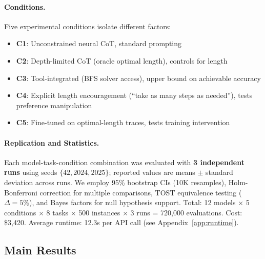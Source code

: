\documentclass{article}
\theoremstyle{plain}
\theoremstyle{definition}
\theoremstyle{remark}
\begin{document}
\paragraph{Conditions.} Five experimental conditions isolate different factors:
\begin{itemize}[leftmargin=*,itemsep=0pt]
\item \textbf{C1}: Unconstrained neural CoT, standard prompting
\item \textbf{C2}: Depth-limited CoT (oracle optimal length), controls for length
\item \textbf{C3}: Tool-integrated (BFS solver access), upper bound on achievable accuracy
\item \textbf{C4}: Explicit length encouragement (``take as many steps as needed''), tests preference manipulation
\item \textbf{C5}: Fine-tuned on optimal-length traces, tests training intervention
\end{itemize}

\paragraph{Replication and Statistics.} Each model-task-condition combination was evaluated with \textbf{3 independent runs} using seeds $\{42, 2024, 2025\}$; reported values are means $\pm$ standard deviation across runs. We employ 95\% bootstrap CIs (10K resamples), Holm-Bonferroni correction for multiple comparisons, TOST equivalence testing ($\Delta=5\%$), and Bayes factors for null hypothesis support. Total: 12 models $\times$ 5 conditions $\times$ 8 tasks $\times$ 500 instances $\times$ 3 runs = 720,000 evaluations. Cost: \$3,420. Average runtime: 12.3s per API call (see Appendix~\ref{app:runtime}).

\subsection{Main Results}
\end{document}
